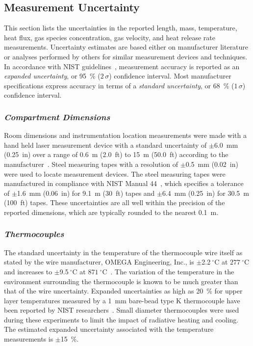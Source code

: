 \subsection{Measurement Uncertainty}
This section lists the uncertainties in the reported length, mass, temperature, heat flux, gas species concentration, gas velocity, and heat release rate measurements. Uncertainty estimates are based either on manufacturer literature or analyses performed by others for similar measurement devices and techniques. In accordance with NIST guidelines~\cite{Taylor&Kuyatt:1994}, measurement accuracy is reported as an \textit{expanded uncertainty}, or 95~\% ($2\,\sigma$) confidence interval. Most manufacturer specifications express accuracy in terms of a \textit{standard  uncertainty}, or 68~\% ($1\,\sigma$) confidence interval.

\subsubsection*{\textit{Compartment Dimensions}}
Room dimensions and instrumentation location measurements were made with a hand held laser measurement device with a standard uncertainty of $\pm$6.0~mm (0.25~in) over a range of 0.6~m (2.0~ft) to 15~m (50.0~ft) according to the manufacturer~\cite{StanleyTools}. Steel measuring tapes with a resolution of $\pm$0.5~mm (0.02~in) were used to locate measurement devices. The steel measuring tapes were manufactured in compliance with NIST Manual 44~\cite{Butcher:2012}, which specifies a tolerance of $\pm$1.6~mm (0.06~in) for 9.1~m (30~ft) tapes and $\pm$6.4~mm (0.25~in) for 30.5~m (100~ft) tapes. These uncertainties are all well within the precision of the reported dimensions, which are typically rounded to the nearest 0.1~m.

\subsubsection*{\textit{Thermocouples}}
The standard uncertainty in the temperature of the thermocouple wire itself as stated by the wire manufacturer, OMEGA Engineering, Inc., is $\pm$2.2$~^{\circ}$C at $277~^{\circ}$C and increases to $\pm$9.5$~^{\circ}$C at $871~^{\circ}$C~\cite{Omega:2004}. The variation of the temperature in the environment surrounding the thermocouple is known to be much greater than that of the wire uncertainty. Expanded uncertainties as high as 20~\% for upper layer temperatures measured by a 1~mm bare-bead type K thermocouple have been reported by NIST researchers~\cite{Blevins:1999,Pitts:2003}. Small diameter thermocouples were used during these experiments to limit the impact of radiative heating and cooling. The estimated expanded uncertainty associated with the temperature measurements is $\pm$15~\%.

